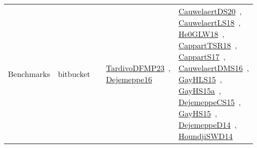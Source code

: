 {\begin{longtable}{lp{3cm}>{\raggedright\arraybackslash}p{6cm}>{\raggedright\arraybackslash}p{6cm}>{\raggedright\arraybackslash}p{8cm}}
Benchmarks & bitbucket &  & \href{works/TardivoDFMP23.pdf}{TardivoDFMP23}~\cite{TardivoDFMP23}, \href{works/Dejemeppe16.pdf}{Dejemeppe16}~\cite{Dejemeppe16} & \href{works/CauwelaertDS20.pdf}{CauwelaertDS20}~\cite{CauwelaertDS20}, \href{works/CauwelaertLS18.pdf}{CauwelaertLS18}~\cite{CauwelaertLS18}, \href{works/He0GLW18.pdf}{He0GLW18}~\cite{He0GLW18}, \href{works/CappartTSR18.pdf}{CappartTSR18}~\cite{CappartTSR18}, \href{works/CappartS17.pdf}{CappartS17}~\cite{CappartS17}, \href{works/CauwelaertDMS16.pdf}{CauwelaertDMS16}~\cite{CauwelaertDMS16}, \href{works/GayHLS15.pdf}{GayHLS15}~\cite{GayHLS15}, \href{works/GayHS15a.pdf}{GayHS15a}~\cite{GayHS15a}, \href{works/DejemeppeCS15.pdf}{DejemeppeCS15}~\cite{DejemeppeCS15}, \href{works/GayHS15.pdf}{GayHS15}~\cite{GayHS15}, \href{works/DejemeppeD14.pdf}{DejemeppeD14}~\cite{DejemeppeD14}, \href{works/HoundjiSWD14.pdf}{HoundjiSWD14}~\cite{HoundjiSWD14}\\

\end{longtable}}
